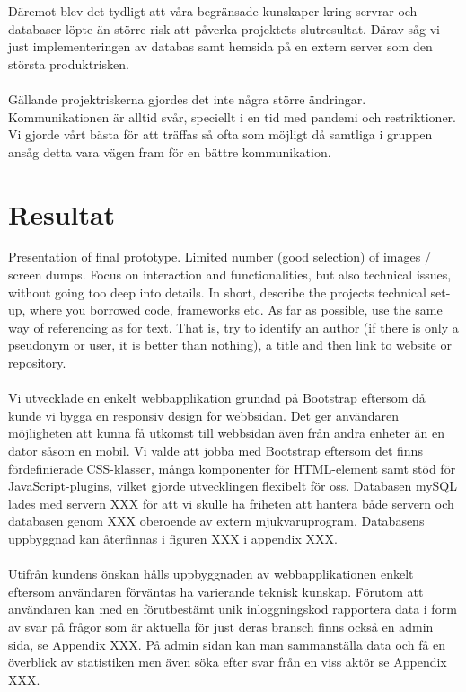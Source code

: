 \documentclass[12pt]{article}
\begin{document}
 Däremot blev det tydligt att våra begränsade kunskaper kring servrar och databaser löpte än större risk att påverka projektets slutresultat. Därav såg vi just implementeringen av databas samt hemsida på en extern server som den största produktrisken.\\\\
 Gällande projektriskerna gjordes det inte några större ändringar. Kommunikationen är alltid svår, speciellt i en tid med pandemi och restriktioner. Vi gjorde vårt bästa för att träffas så ofta som möjligt då samtliga i gruppen ansåg detta vara vägen fram för en bättre kommunikation. 
 

 



\section{Resultat}
Presentation of final prototype. Limited number (good selection) of images / screen dumps. Focus on interaction and functionalities, but also technical issues, without going too deep into details. In short, describe the projects technical set-up, where you borrowed code, frameworks etc. As far as possible, use the same way of referencing as for text. That is, try to identify an author (if there is only a pseudonym or user, it is better than nothing), a title and then link to website or repository.\\\\
Vi utvecklade en enkelt webbapplikation grundad på Bootstrap eftersom då kunde vi bygga en responsiv design för webbsidan. Det ger användaren möjligheten att kunna få utkomst till webbsidan även från andra enheter än en dator såsom en mobil. Vi valde att jobba med Bootstrap eftersom det finns fördefinierade CSS-klasser, många komponenter för HTML-element samt stöd för JavaScript-plugins, vilket gjorde utvecklingen flexibelt för oss. Databasen mySQL lades med servern XXX för att vi skulle ha friheten att hantera både servern och databasen genom XXX oberoende av extern mjukvaruprogram. Databasens uppbyggnad kan återfinnas i figuren XXX i appendix XXX.\\\\
Utifrån kundens önskan hålls uppbyggnaden av webbapplikationen enkelt eftersom användaren förväntas ha varierande teknisk kunskap. Förutom att användaren kan med en förutbestämt unik inloggningskod rapportera data i form av svar på frågor som är aktuella för just deras bransch finns också en admin sida, se Appendix XXX. På admin sidan kan man sammanställa data och få en överblick av statistiken men även söka efter svar från en viss aktör se Appendix XXX. 
\end{document}
